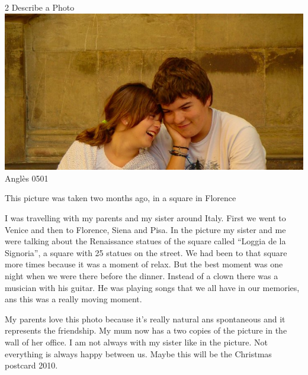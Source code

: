 \begin{news}
{2} %
{Describe a Photo}
{\noindent\includegraphics[width=18cm,keepaspectratio]{angles/img/foto_esteve.jpg}}
{Anglès}
{0501} %


This picture was taken two months ago, in a square in Florence

I was travelling with my parents and my sister around Italy. First we went to Venice and then to Florence, Siena and Pisa. In the picture my sister and me were talking about the Renaissance statues of the square called “Loggia de la Signoria”, a square with 25 statues on the street. We had been to that square more times because it was a moment of relax. But the best moment was one night when we were there before the dinner. Instead of a clown there was a musician with his guitar. He was playing songs that we all have in our memories, ans this was a really moving moment.

My parents love this photo because it's really natural ans spontaneous and it represents the friendship. My mum now has a two copies of the picture in the wall of her office. I am not always with my sister like in the picture. Not everything is always happy between us. Maybe this will be the Christmas postcard 2010.



\end{news}
